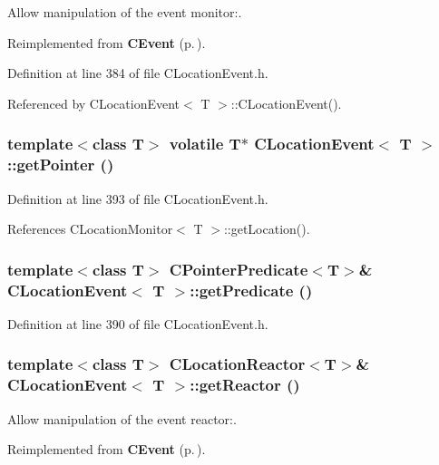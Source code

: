 Allow manipulation of the event monitor:.



Reimplemented from {\bf CEvent} {\rm (p.\,\pageref{classCEvent_a8})}.

Definition at line 384 of file CLocation\-Event.h.

Referenced by CLocation\-Event$<$ T $>$::CLocation\-Event().
\subsubsection{\setlength{\rightskip}{0pt plus 5cm}template$<$class T$>$ volatile T$\ast$ CLocation\-Event$<$ T $>$::get\-Pointer ()\hspace{0.3cm}{\tt  [inline]}}\label{classCLocationEvent_a7}




Definition at line 393 of file CLocation\-Event.h.

References CLocation\-Monitor$<$ T $>$::get\-Location().
\subsubsection{\setlength{\rightskip}{0pt plus 5cm}template$<$class T$>$ {\bf CPointer\-Predicate}$<$T$>$\& CLocation\-Event$<$ T $>$::get\-Predicate ()\hspace{0.3cm}{\tt  [inline]}}\label{classCLocationEvent_a6}




Definition at line 390 of file CLocation\-Event.h.
\subsubsection{\setlength{\rightskip}{0pt plus 5cm}template$<$class T$>$ {\bf CLocation\-Reactor}$<$T$>$\& CLocation\-Event$<$ T $>$::get\-Reactor ()\hspace{0.3cm}{\tt  [inline]}}\label{classCLocationEvent_a5}


Allow manipulation of the event reactor:.



Reimplemented from {\bf CEvent} {\rm (p.\,\pageref{classCEvent_a9})}.

